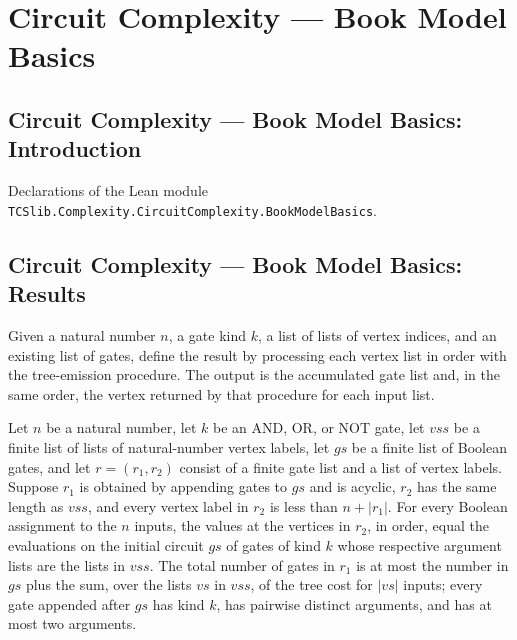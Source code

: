 \section{Circuit Complexity --- Book Model Basics}
\subsection*{Circuit Complexity --- Book Model Basics: Introduction}

Declarations of the Lean module \texttt{TCSlib.Complexity.CircuitComplexity.BookModelBasics}.

\subsection*{Circuit Complexity --- Book Model Basics: Results}

\begin{definition}
\label{BoolCircuit.emitTrees}
\leanok
{}
Given a natural number $n$, a gate kind $k$, a list of lists of vertex indices, and an
existing list of gates, define the result by processing each vertex list in order with
the tree-emission procedure. The output is the accumulated gate list and, in the same
order, the vertex returned by that procedure for each input list.
\end{definition}

\begin{definition}
\label{BoolCircuit.TreesSpec}
\leanok
{}
Let $n$ be a natural number, let $k$ be an AND, OR, or NOT gate, let $vss$ be a finite
list of lists of natural-number vertex labels, let $gs$ be a finite list of Boolean
gates, and let $r=(r_1,r_2)$ consist of a finite gate list and a list of vertex labels.
Suppose $r_1$ is obtained by appending gates to $gs$ and is acyclic, $r_2$ has the same
length as $vss$, and every vertex label in $r_2$ is less than $n+|r_1|$. For every
Boolean assignment to the $n$ inputs, the values at the vertices in $r_2$, in order,
equal the evaluations on the initial circuit $gs$ of gates of kind $k$ whose respective
argument lists are the lists in $vss$. The total number of gates in $r_1$ is at most the
number in $gs$ plus the sum, over the lists $vs$ in $vss$, of the tree cost for $|vs|$
inputs; every gate appended after $gs$ has kind $k$, has pairwise distinct arguments,
and has at most two arguments.
\end{definition}

